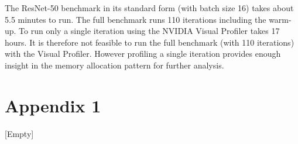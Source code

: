 \documentclass[12pt,twoside]{article}
\begin{document}
The ResNet-50 benchmark in its standard form (with batch size 16) takes about 5.5 minutes to run. The full benchmark runs 110 iterations including the warm-up. To run only a single iteration using the NVIDIA Visual Profiler takes 17 hours. It is therefore not feasible to run the full benchmark (with 110 iterations) with the Visual Profiler. However profiling a single iteration provides enough insight in the memory allocation pattern for further analysis.



\appendix
\section{Appendix 1}

[Empty]
\end{document}
